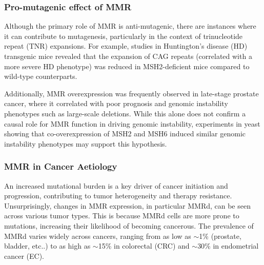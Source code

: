 \documentclass[fleqn,10pt]{olplainarticle}
\begin{document}


\subsubsection{Pro-mutagenic effect of MMR}
Although the primary role of MMR is anti-mutagenic, there are instances where it can contribute to mutagenesis, particularly in the context of trinucleotide repeat (TNR) expansions. For example, studies in Huntington's disease (HD) transgenic mice revealed that the expansion of CAG repeats (correlated with a more severe HD phenotype) was reduced in MSH2-deficient mice compared to wild-type counterparts.

Additionally, MMR overexpression was frequently observed in late-stage prostate cancer, where it correlated with poor prognosis and genomic instability phenotypes such as large-scale deletions. While this alone does not confirm a causal role for MMR function in driving genomic instability, experiments in yeast showing that co-overexpression of MSH2 and MSH6 induced similar genomic instability phenotypes may support this hypothesis.

\newpage

\subsubsection{MMR in Cancer Aetiology}
An increased mutational burden is a key driver of cancer initiation and progression, contributing to tumor heterogeneity and therapy resistance. Unsurprisingly, changes in MMR expression, in particular MMRd, can be seen across various tumor types. This is because MMRd cells are more prone to mutations, increasing their likelihood of becoming cancerous. The prevalence of MMRd varies widely across cancers, ranging from as low as $\sim$1\% (prostate, bladder, etc..) to as high as $\sim$15\% in colorectal (CRC) and $\sim$30\% in endometrial cancer (EC).
\end{document}
